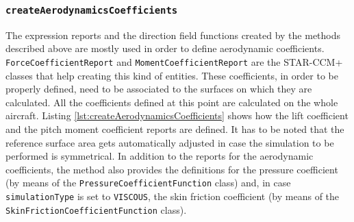 \subsubsection{\texttt{createAerodynamicsCoefficients}}

The expression reports and the direction field functions created by the methods described above are mostly used in order to define aerodynamic coefficients. \lstinline[language=Java]!ForceCoefficientReport! and \lstinline[language=Java]!MomentCoefficientReport! are the STAR-CCM+ classes that help creating this kind of entities. These coefficients, in order to be properly defined, need to be associated to the surfaces on which they are calculated. All the coefficients defined at this point are calculated on the whole aircraft. Listing \ref{lst:createAerodynamicsCoefficients} shows how the lift coefficient and the pitch moment coefficient reports are defined. It has to be noted that the reference surface area gets automatically adjusted in case the simulation to be performed is symmetrical. In addition to the reports for the aerodynamic coefficients, the method also provides the definitions for the pressure coefficient (by means of the \lstinline[language=Java]!PressureCoefficientFunction! class) and, in case \lstinline[language=Java]!simulationType! is set to \lstinline[language=Java]!VISCOUS!, the skin friction coefficient (by means of the \lstinline[language=Java]!SkinFrictionCoefficientFunction! class).
\bigskip
